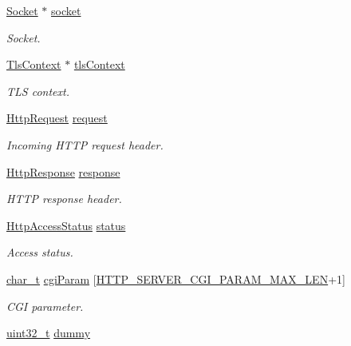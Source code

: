 \begin{DoxyCompactItemize}
\item 
\hyperlink{socket_8h_aa85acfb0fa336ef495e6ba87fb88fc48}{Socket} $\ast$ \hyperlink{struct__HttpConnection_a3a586001947439df268bc5a3fb6dc817}{socket}
\begin{DoxyCompactList}\small\item\em Socket. \end{DoxyCompactList}\item 
\hyperlink{tls_8h_ac09f7a286c0cdf9b07ee1edd107946f5}{Tls\+Context} $\ast$ \hyperlink{struct__HttpConnection_adf158830c8a41b5b3e1f9f632e93b01f}{tls\+Context}
\begin{DoxyCompactList}\small\item\em T\+LS context. \end{DoxyCompactList}\item 
\hyperlink{structHttpRequest}{Http\+Request} \hyperlink{struct__HttpConnection_a847bc3bc0c12c03e8410d2b5ee2d5586}{request}
\begin{DoxyCompactList}\small\item\em Incoming H\+T\+TP request header. \end{DoxyCompactList}\item 
\hyperlink{structHttpResponse}{Http\+Response} \hyperlink{struct__HttpConnection_ac70e7a2a9acb5be032d9fbc2e4fdf8f2}{response}
\begin{DoxyCompactList}\small\item\em H\+T\+TP response header. \end{DoxyCompactList}\item 
\hyperlink{http__server_8h_a208042b9481360af1650fad94cd93769}{Http\+Access\+Status} \hyperlink{struct__HttpConnection_acdbeb9e2efd1fe6910ca0155c5544280}{status}
\begin{DoxyCompactList}\small\item\em Access status. \end{DoxyCompactList}\item 
\hyperlink{compiler__port_8h_a40bb5262bf908c328fbcfbe5d29d0201}{char\+\_\+t} \hyperlink{struct__HttpConnection_a7ebae941dca2f49564380d3033849463}{cgi\+Param} \mbox{[}\hyperlink{http__server_8h_a4a3fc828d1b1db329b49b1f339eb06fe}{H\+T\+T\+P\+\_\+\+S\+E\+R\+V\+E\+R\+\_\+\+C\+G\+I\+\_\+\+P\+A\+R\+A\+M\+\_\+\+M\+A\+X\+\_\+\+L\+EN}+1\mbox{]}
\begin{DoxyCompactList}\small\item\em C\+GI parameter. \end{DoxyCompactList}\item 
\hyperlink{stdint_8h_a435d1572bf3f880d55459d9805097f62}{uint32\+\_\+t} \hyperlink{struct__HttpConnection_aee9025afb7e8638df5481f8ecc0ec689}{dummy}

\end{DoxyCompactItemize}
